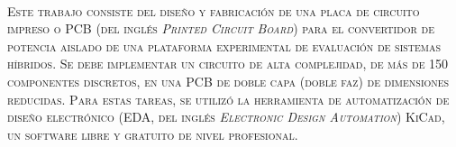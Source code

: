 \huge
\scshape\color{AzulFI_dark}
\\

\normalfont\normalsize\normalcolor
Este trabajo consiste del diseño y fabricación de una placa de circuito impreso o PCB (del inglés \textit{Printed Circuit Board}) para el convertidor de potencia aislado de una plataforma experimental de evaluación de sistemas híbridos. Se debe implementar un circuito de alta complejidad, de más de 150 componentes discretos, en una PCB de doble capa (doble faz) de dimensiones reducidas. Para estas tareas, se utilizó la herramienta de automatización de diseño electrónico (EDA, del inglés \textit{Electronic Design Automation}) KiCad, un software libre y gratuito de nivel profesional.\\



